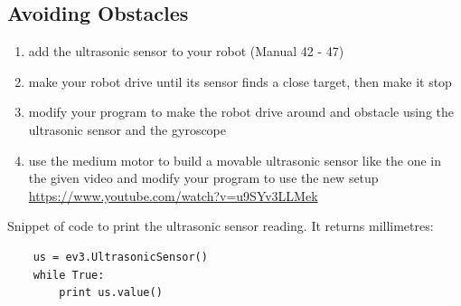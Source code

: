 \documentclass{article}
\begin{document}
  \subsection{Avoiding Obstacles}
  \begin{enumerate}
    \item add the ultrasonic sensor to your robot (Manual 42 - 47)
    \item make your robot drive until its sensor finds a close target, then make it stop
    \item modify your program to make the robot drive around and obstacle using the ultrasonic
        sensor and the gyroscope
    \item use the medium motor to build a movable ultrasonic sensor like the one
        in the given video and modify your program to use the new setup \\
        \url{https://www.youtube.com/watch?v=u9SYv3LLMek}
  \end{enumerate}

  Snippet of code to print the ultrasonic sensor reading. It returns millimetres:
  \begin{verbatim}
    us = ev3.UltrasonicSensor()
    while True:
        print us.value()
  \end{verbatim}
\end{document}
